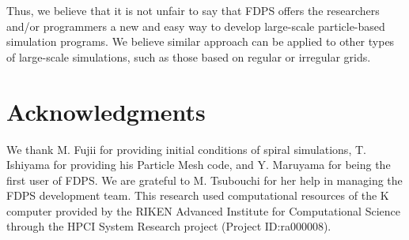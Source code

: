 \documentclass[dvipdfmx]{acm_proc_article-sp}
\begin{document}
Thus, we believe that it is not unfair to say that FDPS offers the
researchers and/or programmers  a new and easy way to
develop large-scale particle-based simulation programs. We believe
similar approach can be applied to other types of large-scale
simulations, such as those based on regular or irregular grids.





\section{Acknowledgments}

We thank M. Fujii for providing initial conditions of spiral
simulations, T. Ishiyama for providing his Particle Mesh code, and
Y. Maruyama for being the first user of FDPS.  We are grateful to
M. Tsubouchi for her help in managing the FDPS development team. This
research used computational resources of the K computer provided by
the RIKEN Advanced Institute for Computational Science through the
HPCI System Research project (Project ID:ra000008).


%

\end{document}
